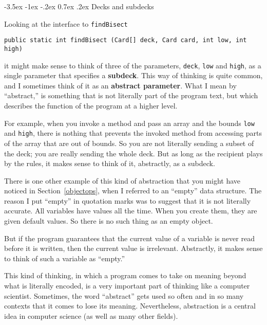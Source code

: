 \documentclass{book}
\makeatletter
\renewcommand{\section}{\@startsection 
    {section} {1} {0mm}%
    {-3.5ex \@plus -1ex \@minus -.2ex}%
    {0.7ex \@plus.2ex}%
    {\normalfont\Large\bfseries}}
\makeatother
\begin{document}


\section{Decks and subdecks}

Looking at the interface to {\tt findBisect}

\begin{verbatim}
public static int findBisect (Card[] deck, Card card, int low, int high)
\end{verbatim}


it might make sense to think of three of the parameters, {\tt deck},
{\tt low} and {\tt high}, as a single parameter that specifies a {\bf
subdeck}.  This way of thinking is quite common, and I sometimes think
of it as an {\bf abstract parameter}.  What I mean by ``abstract,'' is
something that is not literally part of the program text, but which
describes the function of the program at a higher level.

For example, when you invoke a method and pass an array and the bounds
{\tt low} and {\tt high}, there is nothing that prevents the invoked
method from accessing parts of the array that are out of bounds.  So
you are not literally sending a subset of the deck; you are really
sending the whole deck.  But as long as the recipient plays by the
rules, it makes sense to think of it, abstractly, as a subdeck.

There is one other example of this kind of abstraction that you might
have noticed in Section~\ref{objectops}, when I referred to an
``empty'' data structure.  The reason I put ``empty'' in quotation
marks was to suggest that it is not literally accurate.  All variables
have values all the time.  When you create them, they are given
default values.  So there is no such thing as an empty object.

But if the program guarantees that the current value of a variable is
never read before it is written, then the current value is irrelevant.
Abstractly, it makes sense to think of such a variable as ``empty.''

This kind of thinking, in which a program comes to take on meaning
beyond what is literally encoded, is a very important part of thinking
like a computer scientist.  Sometimes, the word ``abstract'' gets used
so often and in so many contexts that it comes to lose its meaning.
Nevertheless, abstraction is a central idea in computer science (as
well as many other fields).
\end{document}
